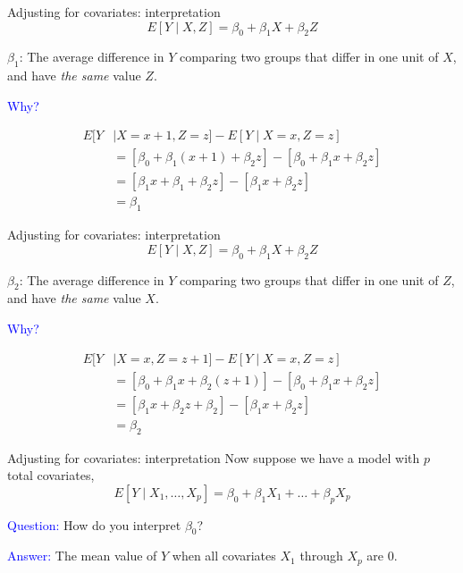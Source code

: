 \documentclass[10pt,t]{beamer}
\begin{document}
\begin{frame}{Adjusting for covariates: interpretation}
$$
E[Y \mid X, Z] = \beta_0 + \beta_1 X + \beta_2 Z
$$

\vspace{0.3cm}

$\beta_1$: The average difference in $Y$ comparing two groups that differ in one unit of $X$, and have \textit{the same} value $Z$.

\vspace{0.3cm}

\textcolor{blue}{Why?} \pause 

\begin{align*}
E[Y & \mid X = x + 1, Z = z] - E[Y \mid X = x, Z = z] \\
& = [\beta_0 + \beta_1(x + 1) + \beta_2 z] - [\beta_0 + \beta_1x + \beta_2 z] \\
& = [\beta_1 x + \beta_1 + \beta_2 z] - [\beta_1 x + \beta_2 z] \\
& = \beta_1
\end{align*}

\end{frame}

\begin{frame}{Adjusting for covariates: interpretation}
$$
E[Y \mid X, Z] = \beta_0 + \beta_1 X + \beta_2 Z
$$

\vspace{0.3cm}

$\beta_2$: The average difference in $Y$ comparing two groups that differ in one unit of $Z$, and have \textit{the same} value $X$.

\vspace{0.3cm}

\textcolor{blue}{Why?} \pause 

\begin{align*}
E[Y & \mid X = x, Z = z + 1] - E[Y \mid X = x, Z = z] \\
& = [\beta_0 + \beta_1 x + \beta_2 (z + 1)] - [\beta_0 + \beta_1x + \beta_2 z] \\
& = [\beta_1 x + \beta_2 z + \beta_2] - [\beta_1 x + \beta_2 z] \\
& = \beta_2
\end{align*}

\end{frame}

\begin{frame}{Adjusting for covariates: interpretation}
Now suppose we have a model with $p$ total covariates,
$$
E[Y \mid X_1, \dots, X_p] = \beta_0 + \beta_1 X_1 + \dots + \beta_p X_p
$$

\textcolor{blue}{Question:} How do you interpret $\beta_0$? \pause

\vspace{0.3cm}

\textcolor{blue}{Answer:} The mean value of $Y$ when all covariates $X_1$ through $X_p$ are $0$.
\end{frame}
\end{document}
